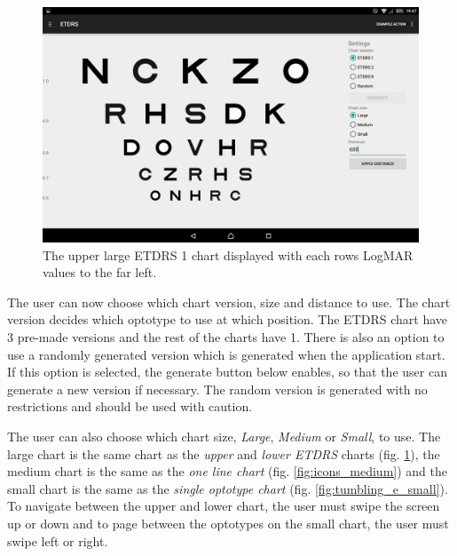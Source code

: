 \documentclass[12pt,a4paper,notitlepage]{report}
\begin{document}
\begin{figure}[ht!]
\centering
\includegraphics[width=120mm]{images/appgui/etdrs_large.png}
\caption{The upper large ETDRS 1 chart displayed with each rows LogMAR values to the far left.}
\label{fig:etdrs_large}
\end{figure}

The user can now choose which chart version, size and distance to use. The chart version decides which optotype to use at which position. The ETDRS chart have 3 pre-made versions\cite{Ferris} and the rest of the charts have 1. There is also an option to use a randomly generated version which is generated when the application start. If this option is selected, the generate button below enables, so that the user can generate a new version if necessary. The random version is generated with no restrictions and should be used with caution.

The user can also choose which chart size, \textit{Large}, \textit{Medium} or \textit{Small}, to use. The large chart is the same chart as the \textit{upper} and \textit{lower ETDRS} charts (fig. \ref{fig:etdrs_large}), the medium chart is the same as the \textit{one line chart} (fig. \ref{fig:icons_medium}) and the small chart is the same as the \textit{single optotype chart} (fig. \ref{fig:tumbling_e_small}). To navigate between the upper and lower chart, the user must swipe the screen up or down and to page between the optotypes on the small chart, the user must swipe left or right.
\end{document}
